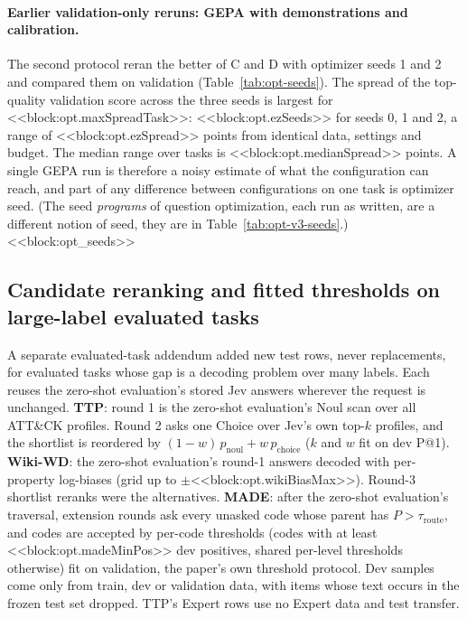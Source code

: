 \paragraph{Earlier validation-only reruns: GEPA with demonstrations and calibration.}
The second protocol reran the better of C and D with optimizer seeds 1 and 2 and compared them on validation (Table~\ref{tab:opt-seeds}). The spread of the top-quality validation score across the three seeds is largest for <<block:opt.maxSpreadTask>>: <<block:opt.ezSeeds>> for seeds 0, 1 and 2, a range of <<block:opt.ezSpread>> points from identical data, settings and budget. The median range over tasks is <<block:opt.medianSpread>> points. A single GEPA run is therefore a noisy estimate of what the configuration can reach, and part of any difference between configurations on one task is optimizer seed. (The seed \emph{programs} of question optimization, each run as written, are a different notion of seed, they are in Table~\ref{tab:opt-v3-seeds}.)
<<block:opt_seeds>>

\subsection{Candidate reranking and fitted thresholds on large-label evaluated tasks}\label{app:opt-leverc}
A separate evaluated-task addendum added new test rows, never replacements, for evaluated tasks whose gap is a decoding problem over many labels. Each reuses the zero-shot evaluation's stored Jev answers wherever the request is unchanged. \textbf{TTP}: round 1 is the zero-shot evaluation's Noul scan over all ATT\&CK profiles. Round 2 asks one Choice over Jev's own top-$k$ profiles, and the shortlist is reordered by $(1-w)\,p_{\text{noul}} + w\,p_{\text{choice}}$ ($k$ and $w$ fit on dev P@1). \textbf{Wiki-WD}: the zero-shot evaluation's round-1 answers decoded with per-property log-biases (grid up to $\pm$<<block:opt.wikiBiasMax>>). Round-3 shortlist reranks were the alternatives. \textbf{MADE}: after the zero-shot evaluation's traversal, extension rounds ask every unasked code whose parent has $P > \tau_{\text{route}}$, and codes are accepted by per-code thresholds (codes with at least <<block:opt.madeMinPos>> dev positives, shared per-level thresholds otherwise) fit on validation, the paper's own threshold protocol. Dev samples come only from train, dev or validation data, with items whose text occurs in the frozen test set dropped. TTP's Expert rows use no Expert data and test transfer.

